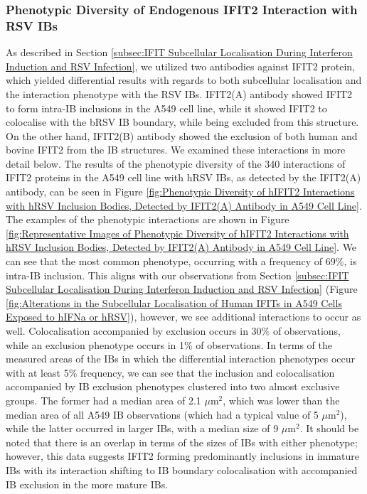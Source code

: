 \subsubsection{Phenotypic Diversity of Endogenous IFIT2 Interaction with RSV IBs}
As described in Section \ref{subsec:IFIT Subcellular Localisation During Interferon Induction and RSV Infection}, we utilized two antibodies against IFIT2 protein, which yielded differential results with regards to both subcellular localisation and the interaction phenotype with the RSV IBs. IFIT2(A) antibody showed IFIT2 to form intra-IB inclusions in the A549 cell line, while it showed IFIT2 to colocalise with the bRSV IB boundary, while being excluded from this structure. On the other hand, IFIT2(B) antibody showed the exclusion of both human and bovine IFIT2 from the IB structures. We examined these interactions in more detail below. The results of the phenotypic diversity of the 340 interactions of IFIT2 proteins in the A549 cell line with hRSV IBs, as detected by the IFIT2(A) antibody, can be seen in Figure \ref{fig:Phenotypic Diversity of hIFIT2 Interactions with hRSV Inclusion Bodies, Detected by IFIT2(A) Antibody in A549 Cell Line}. The examples of the phenotypic interactions are shown in Figure \ref{fig:Representative Images of Phenotypic Diversity of hIFIT2 Interactions with hRSV Inclusion Bodies, Detected by IFIT2(A) Antibody in A549 Cell Line}. We can see that the most common phenotype, occurring with a frequency of 69\%, is intra-IB inclusion. This aligns with our observations from Section \ref{subsec:IFIT Subcellular Localisation During Interferon Induction and RSV Infection} (Figure \ref{fig:Alterations in the Subcellular Localisation of Human IFITs in A549 Cells Exposed to hIFNa or hRSV}), however, we see additional interactions to occur as well. Colocalisation accompanied by exclusion occurs in 30\% of observations, while an exclusion phenotype occurs in 1\% of observations. In terms of the measured areas of the IBs in which the differential interaction phenotypes occur with at least 5\% frequency, we can see that the inclusion and colocalisation accompanied by IB exclusion phenotypes clustered into two almost exclusive groups. The former had a median area of 2.1 \(\mu \mbox{m}^2\), which was lower than the median area of all A549 IB observations (which had a typical value of 5 \(\mu \mbox{m}^2\)), while the latter occurred in larger IBs, with a median size of 9 \(\mu \mbox{m}^2\). It should be noted that there is an overlap in terms of the sizes of IBs with either phenotype; however, this data suggests IFIT2 forming predominantly inclusions in immature IBs with its interaction shifting to IB boundary colocalisation with accompanied IB exclusion in the more mature IBs.


